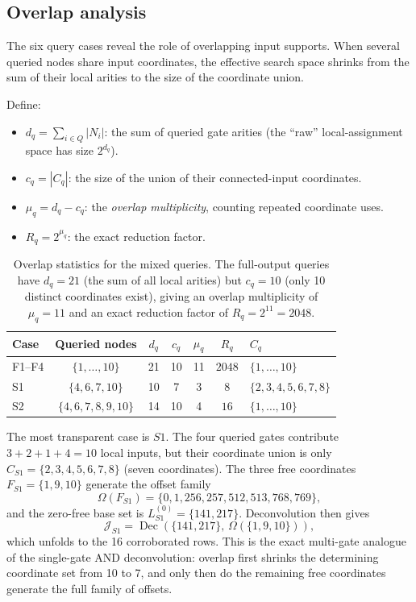 \documentclass[11pt]{article}
\begin{document}
\subsection{Overlap analysis}\label{sec:overlap}

The six query cases reveal the role of overlapping input supports.
When several queried nodes share input coordinates, the effective
search space shrinks from the sum of their local arities to the size
of the coordinate union.

Define:
\begin{itemize}
\item $d_q = \sum_{i\in Q}|N_i|$: the sum of queried gate arities
  (the ``raw'' local-assignment space has size $2^{d_q}$).
\item $c_q = |C_q|$: the size of the union of their connected-input
  coordinates.
\item $\mu_q = d_q - c_q$: the \emph{overlap multiplicity}, counting
  repeated coordinate uses.
\item $R_q = 2^{\mu_q}$: the exact reduction factor.
\end{itemize}

\begin{table}[h]
\centering
\small
\begin{tabular}{@{}lcccccl@{}}
\toprule
Case & Queried nodes & $d_q$ & $c_q$ & $\mu_q$ & $R_q$ & $C_q$ \\
\midrule
F1--F4 & $\{1,\ldots,10\}$ & 21 & 10 & 11 & $2048$ & $\{1,\ldots,10\}$ \\
S1 & $\{4,6,7,10\}$ & 10 & 7 & 3 & $8$ & $\{2,3,4,5,6,7,8\}$ \\
S2 & $\{4,6,7,8,9,10\}$ & 14 & 10 & 4 & $16$ & $\{1,\ldots,10\}$ \\
\bottomrule
\end{tabular}
\caption{Overlap statistics for the mixed queries.  The full-output queries
have $d_q=21$ (the sum of all local arities) but $c_q=10$ (only 10 distinct
coordinates exist), giving an overlap multiplicity of $\mu_q=11$ and an
exact reduction factor of $R_q=2^{11}=2048$.}
\label{tab:overlap-stats}
\end{table}

The most transparent case is $S1$.  The four queried gates contribute
$3+2+1+4=10$ local inputs, but their coordinate union is only
$C_{S1}=\{2,3,4,5,6,7,8\}$ (seven coordinates).  The three free
coordinates $F_{S1}=\{1,9,10\}$ generate the offset family
\[
\Omega(F_{S1}) = \{0,1,256,257,512,513,768,769\},
\]
and the zero-free base set is $L_{S1}^{(0)}=\{141,217\}$.  Deconvolution
then gives
\[
\mathcal{J}_{S1} = \operatorname{Dec}(\{141,217\},\,\Omega(\{1,9,10\})),
\]
which unfolds to the 16 corroborated rows.  This is the exact multi-gate
analogue of the single-gate AND deconvolution: overlap first shrinks the
determining coordinate set from 10 to 7, and only then do the remaining
free coordinates generate the full family of offsets.
\end{document}
